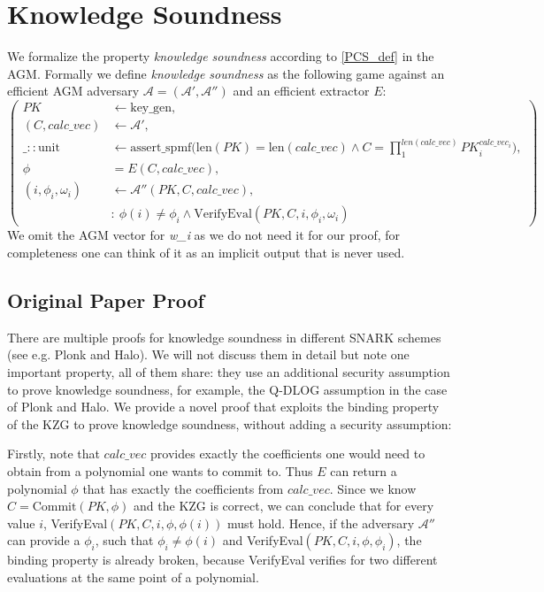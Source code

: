 \section{Knowledge Soundness}
\label{security:knowledgesound}
We formalize the property \textit{knowledge soundness} according to \ref{PCS_def} in the AGM. Formally we define \textit{knowledge soundness} as the following game against an efficient AGM adversary $\mathcal{A=(A',A'')}$ and an efficient extractor $E$: 
\begin{equation*}
    \left(
        \begin{aligned}
            PK &\leftarrow \text{key\_gen}, \\
            (C,calc\_vec) &\leftarrow \mathcal{A'}, \\
            \_::\text{unit} &\leftarrow \text{assert\_spmf}\biggl(\text{len}(PK)=\text{len}(calc\_vec) \land C = \prod_{1}^{len(calc\_vec)}PK_i^{calc\_vec_i}\biggr), \\
            \phi &= E(C, calc\_vec),\\
            (i, \phi_i, \omega_i) &\leftarrow \mathcal{A''}(PK, C, calc\_vec), \\
            & : \ \phi(i) \ne \phi_i \land \text{VerifyEval}(PK,C,i,\phi_i,\omega_i)
        \end{aligned}
        \right)
\end{equation*}
We omit the AGM vector for \textit{w\_i} as we do not need it for our proof, for completeness one can think of it as an implicit output that is never used.

\subsection{Original Paper Proof}
\label{security:knowledge:paper}
There are multiple proofs for knowledge soundness in different SNARK schemes (see e.g. Plonk\parencite{plonk} and Halo\parencite{halo}). We will not discuss them in detail but note one important property, all of them share: they use an additional security assumption to prove knowledge soundness, for example, the Q-DLOG assumption in the case of Plonk and Halo. We provide a novel proof that exploits the binding property of the KZG to prove knowledge soundness, without adding a security assumption: 

Firstly, note that $calc\_vec$ provides exactly the coefficients one would need to obtain from a polynomial one wants to commit to. Thus $E$ can return a polynomial $\phi$ that has exactly the coefficients from $calc\_vec$. Since we know $C= \text{Commit}(PK, \phi)$ and the KZG is correct, we can conclude that for every value $i$, VerifyEval$(PK, C, i, \phi, \phi(i))$ must hold. Hence, if the adversary $\mathcal{A''}$ can provide a $\phi_i$, such that $\phi_i\ne\phi(i)$
and VerifyEval$(PK, C, i, \phi, \phi_i)$, the binding property is already broken, because VerifyEval verifies for two different evaluations at the same point of a polynomial.

